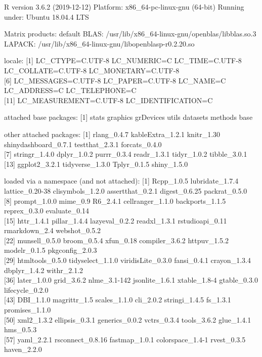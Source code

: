 \documentclass[
]{article}
\begin{document}
R version 3.6.2 (2019-12-12) Platform: x86\_64-pc-linux-gnu (64-bit)
Running under: Ubuntu 18.04.4 LTS

Matrix products: default BLAS:
/usr/lib/x86\_64-linux-gnu/openblas/libblas.so.3 LAPACK:
/usr/lib/x86\_64-linux-gnu/libopenblasp-r0.2.20.so

locale: {[}1{]} LC\_CTYPE=C.UTF-8 LC\_NUMERIC=C LC\_TIME=C.UTF-8
LC\_COLLATE=C.UTF-8 LC\_MONETARY=C.UTF-8\\
{[}6{]} LC\_MESSAGES=C.UTF-8 LC\_PAPER=C.UTF-8 LC\_NAME=C LC\_ADDRESS=C
LC\_TELEPHONE=C\\
{[}11{]} LC\_MEASUREMENT=C.UTF-8 LC\_IDENTIFICATION=C

attached base packages: {[}1{]} stats graphics grDevices utils datasets
methods base

other attached packages: {[}1{]} rlang\_0.4.7 kableExtra\_1.2.1
knitr\_1.30 shinydashboard\_0.7.1 testthat\_2.3.1 forcats\_0.4.0\\
{[}7{]} stringr\_1.4.0 dplyr\_1.0.2 purrr\_0.3.4 readr\_1.3.1
tidyr\_1.0.2 tibble\_3.0.1\\
{[}13{]} ggplot2\_3.2.1 tidyverse\_1.3.0 Tplyr\_0.1.5 shiny\_1.5.0

loaded via a namespace (and not attached): {[}1{]} Rcpp\_1.0.5
lubridate\_1.7.4 lattice\_0.20-38 clisymbols\_1.2.0 assertthat\_0.2.1
digest\_0.6.25 packrat\_0.5.0\\
{[}8{]} prompt\_1.0.0 mime\_0.9 R6\_2.4.1 cellranger\_1.1.0
backports\_1.1.5 reprex\_0.3.0 evaluate\_0.14\\
{[}15{]} httr\_1.4.1 pillar\_1.4.4 lazyeval\_0.2.2 readxl\_1.3.1
rstudioapi\_0.11 rmarkdown\_2.4 webshot\_0.5.2\\
{[}22{]} munsell\_0.5.0 broom\_0.5.4 xfun\_0.18 compiler\_3.6.2
httpuv\_1.5.2 modelr\_0.1.5 pkgconfig\_2.0.3\\
{[}29{]} htmltools\_0.5.0 tidyselect\_1.1.0 viridisLite\_0.3.0
fansi\_0.4.1 crayon\_1.3.4 dbplyr\_1.4.2 withr\_2.1.2\\
{[}36{]} later\_1.0.0 grid\_3.6.2 nlme\_3.1-142 jsonlite\_1.6.1
xtable\_1.8-4 gtable\_0.3.0 lifecycle\_0.2.0\\
{[}43{]} DBI\_1.1.0 magrittr\_1.5 scales\_1.1.0 cli\_2.0.2
stringi\_1.4.5 fs\_1.3.1 promises\_1.1.0\\
{[}50{]} xml2\_1.3.2 ellipsis\_0.3.1 generics\_0.0.2 vctrs\_0.3.4
tools\_3.6.2 glue\_1.4.1 hms\_0.5.3\\
{[}57{]} yaml\_2.2.1 rsconnect\_0.8.16 fastmap\_1.0.1 colorspace\_1.4-1
rvest\_0.3.5 haven\_2.2.0
\end{document}
